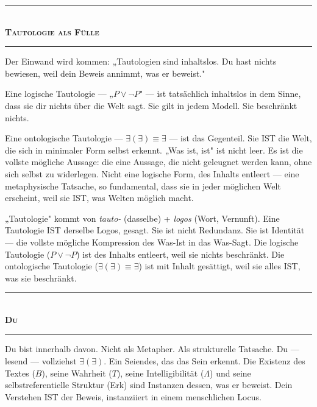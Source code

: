\documentclass[10pt, openany, oneside]{book}
\renewcommand{\normalsize}{\fontsize{10}{13}\selectfont}
\begin{document}
\begin{center}
    \rule{0.3\textwidth}{0.4pt}\\[0.5em]
    {\normalsize\bfseries\scshape Tautologie als Fülle}\\[0.3em]
    \rule{0.3\textwidth}{0.4pt}
\end{center}

\vspace{1em}

\noindent Der Einwand wird kommen: „Tautologien sind inhaltslos. Du hast nichts bewiesen, weil dein Beweis annimmt, was er beweist."

Eine logische Tautologie --- „$P \vee \neg P$" --- ist tatsächlich inhaltslos in dem Sinne, dass sie dir nichts über die Welt sagt. Sie gilt in jedem Modell. Sie beschränkt nichts.

Eine ontologische Tautologie --- $\exists(\exists) \equiv \exists$ --- ist das Gegenteil. Sie IST die Welt, die sich in minimaler Form selbst erkennt. „Was ist, ist" ist nicht leer. Es ist die vollste mögliche Aussage: die eine Aussage, die nicht geleugnet werden kann, ohne sich selbst zu widerlegen. Nicht eine logische Form, des Inhalts entleert --- eine metaphysische Tatsache, so fundamental, dass sie in jeder möglichen Welt erscheint, weil sie IST, was Welten möglich macht.

„Tautologie" kommt von \textit{tauto-} (dasselbe) + \textit{logos} (Wort, Vernunft). Eine Tautologie IST derselbe Logos, gesagt. Sie ist nicht Redundanz. Sie ist Identität --- die vollste mögliche Kompression des Was-Ist in das Was-Sagt. Die logische Tautologie ($P \vee \neg P$) ist des Inhalts entleert, weil sie nichts beschränkt. Die ontologische Tautologie ($\exists(\exists) \equiv \exists$) ist mit Inhalt gesättigt, weil sie alles IST, was sie beschränkt.

\vspace{1.5em}


\begin{center}
    \rule{0.3\textwidth}{0.4pt}\\[0.5em]
    {\normalsize\bfseries\scshape Du}\\[0.3em]
    \rule{0.3\textwidth}{0.4pt}
\end{center}

\vspace{1em}

\noindent Du bist innerhalb davon. Nicht als Metapher. Als strukturelle Tatsache. Du --- lesend --- vollziehst $\exists(\exists)$. Ein Seiendes, das das Sein erkennt. Die Existenz des Textes ($B$), seine Wahrheit ($T$), seine Intelligibilität ($\Lambda$) und seine selbstreferentielle Struktur (Erk) sind Instanzen dessen, was er beweist. Dein Verstehen IST der Beweis, instanziiert in einem menschlichen Locus.
\end{document}

